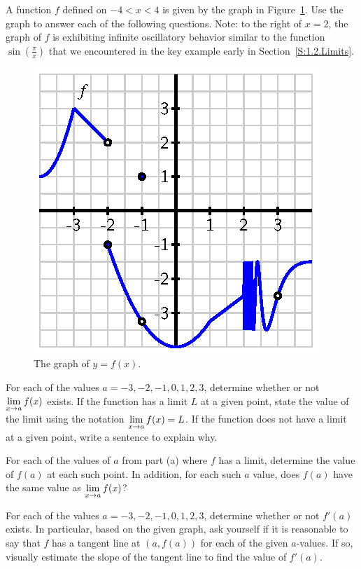 \begin{pa} \label{PA:1.7}
A function $f$ defined on $-4 < x < 4$ is given by the graph in Figure~\ref{F:1.7.PA1}.  Use the graph to answer each of the following questions.  Note: to the right of $x = 2$, the graph of $f$ is exhibiting infinite oscillatory behavior similar to the function $\sin(\frac{\pi}{x})$ that we encountered in the key example early in Section~\ref{S:1.2.Limits}.
\begin{figure}[h]
\begin{center}
\includegraphics{figures/1_7_PA1.eps}
\caption{The graph of $y = f(x)$.} \label{F:1.7.PA1}
\end{center}
\end{figure}
\ba
	\item For each of the values $a = -3, -2, -1, 0, 1, 2, 3$, determine whether or not $\displaystyle \lim_{x \to a} f(x)$ exists.  If the function has a limit $L$ at a given point, state the value of the limit using the notation $\displaystyle \lim_{x \to a} f(x) = L$.  If the function does not have a limit at a given point, write a sentence to explain why.
	\item For each of the values of $a$ from part (a) where $f$ has a limit, determine the value of $f(a)$ at each such point.  In addition, for each such $a$ value, does $f(a)$ have the same value as $\displaystyle \lim_{x \to a} f(x)$?
	\item For each of the values $a = -3, -2, -1, 0, 1, 2, 3$, determine whether or not $f'(a)$ exists.  In particular, based on the given graph, ask yourself if it is reasonable to say that $f$ has a tangent line at $(a,f(a))$ for each of the given $a$-values.  If so, visually estimate the slope of the tangent line to find the value of $f'(a)$.
\ea
\end{pa} 

\afterpa

